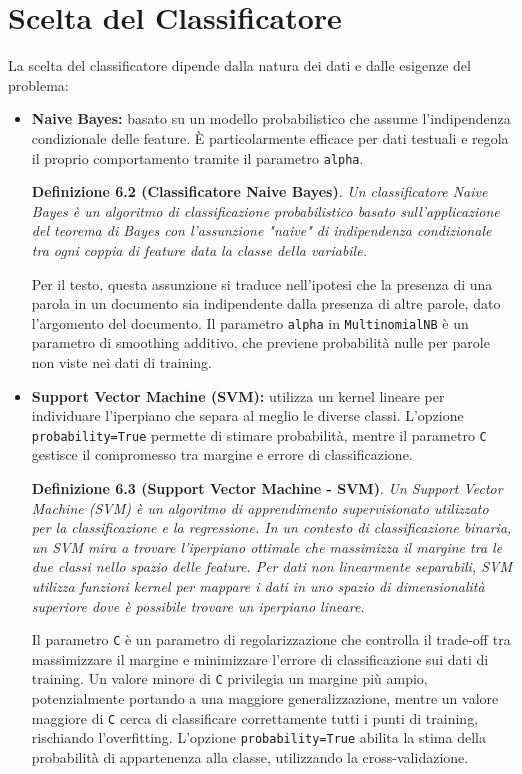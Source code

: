  \section{Scelta del Classificatore}
 La scelta del classificatore dipende dalla natura dei dati e dalle esigenze del problema:
 \begin{itemize}
   \item \textbf{Naive Bayes:} basato su un modello probabilistico che assume l'indipendenza condizionale delle feature. È particolarmente efficace per dati testuali e regola il proprio comportamento tramite il parametro \texttt{alpha}.

   \textbf{Definizione 6.2 (Classificatore Naive Bayes)}. \textit{Un classificatore Naive Bayes è un algoritmo di classificazione probabilistico basato sull'applicazione del teorema di Bayes con l'assunzione "naive" di indipendenza condizionale tra ogni coppia di feature data la classe della variabile.}

   Per il testo, questa assunzione si traduce nell'ipotesi che la presenza di una parola in un documento sia indipendente dalla presenza di altre parole, dato l'argomento del documento. Il parametro \texttt{alpha} in \texttt{MultinomialNB} è un parametro di smoothing additivo, che previene probabilità nulle per parole non viste nei dati di training.

   \item \textbf{Support Vector Machine (SVM):} utilizza un kernel lineare per individuare l'iperpiano che separa al meglio le diverse classi. L'opzione \texttt{probability=True} permette di stimare probabilità, mentre il parametro \texttt{C} gestisce il compromesso tra margine e errore di classificazione.

   \textbf{Definizione 6.3 (Support Vector Machine - SVM)}. \textit{Un Support Vector Machine (SVM) è un algoritmo di apprendimento supervisionato utilizzato per la classificazione e la regressione. In un contesto di classificazione binaria, un SVM mira a trovare l'iperpiano ottimale che massimizza il margine tra le due classi nello spazio delle feature. Per dati non linearmente separabili, SVM utilizza funzioni kernel per mappare i dati in uno spazio di dimensionalità superiore dove è possibile trovare un iperpiano lineare.}

   Il parametro \texttt{C} è un parametro di regolarizzazione che controlla il trade-off tra massimizzare il margine e minimizzare l'errore di classificazione sui dati di training. Un valore minore di \texttt{C} privilegia un margine più ampio, potenzialmente portando a una maggiore generalizzazione, mentre un valore maggiore di \texttt{C} cerca di classificare correttamente tutti i punti di training, rischiando l'overfitting. L'opzione \texttt{probability=True} abilita la stima della probabilità di appartenenza alla classe, utilizzando la cross-validazione.
 \end{itemize}
 \newpage

